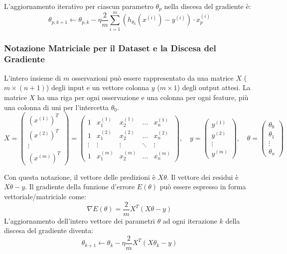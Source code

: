 \documentclass{article}
\begin{document}
L'aggiornamento iterativo per ciascun parametro $\theta_p$ nella discesa del gradiente è:
$$ \theta_{p, k+1} \leftarrow \theta_{p, k} - \eta \frac{2}{m} \sum_{i=1}^{m} (h_{\theta_k}(x^{(i)}) - y^{(i)}) \cdot x_p^{(i)} $$

\subsubsection{Notazione Matriciale per il Dataset e la Discesa del Gradiente}
L'intero insieme di $m$ osservazioni può essere rappresentato da una matrice $X$ ($m \times (n+1)$) degli input e un vettore colonna $y$ ($m \times 1$) degli output attesi.
La matrice $X$ ha una riga per ogni osservazione e una colonna per ogni feature, più una colonna di uni per l'intercetta $\theta_0$.
$$ X = \begin{pmatrix}
        (x^{(1)})^T \\
        (x^{(2)})^T \\
        \vdots      \\
        (x^{(m)})^T
    \end{pmatrix} = \begin{pmatrix}
        1      & x_1^{(1)} & x_2^{(1)} & \dots  & x_n^{(1)} \\
        1      & x_1^{(2)} & x_2^{(2)} & \dots  & x_n^{(2)} \\
        \vdots & \vdots    & \vdots    & \ddots & \vdots    \\
        1      & x_1^{(m)} & x_2^{(m)} & \dots  & x_n^{(m)}
    \end{pmatrix}, \quad y = \begin{pmatrix}
        y^{(1)} \\
        y^{(2)} \\
        \vdots  \\
        y^{(m)}
    \end{pmatrix}, \quad \theta = \begin{pmatrix}
        \theta_0 \\
        \theta_1 \\
        \vdots   \\
        \theta_n
    \end{pmatrix} $$

Con questa notazione, il vettore delle predizioni è $X\theta$. Il vettore dei residui è $X\theta - y$.
Il gradiente della funzione d'errore $E(\theta)$ può essere espresso in forma vettoriale/matriciale come:
$$ \nabla E(\theta) = \frac{2}{m} X^T (X\theta - y) $$
L'aggiornamento dell'intero vettore dei parametri $\theta$ ad ogni iterazione $k$ della discesa del gradiente diventa:
$$ \theta_{k+1} \leftarrow \theta_k - \eta \frac{2}{m} X^T (X\theta_k - y) $$
\end{document}
